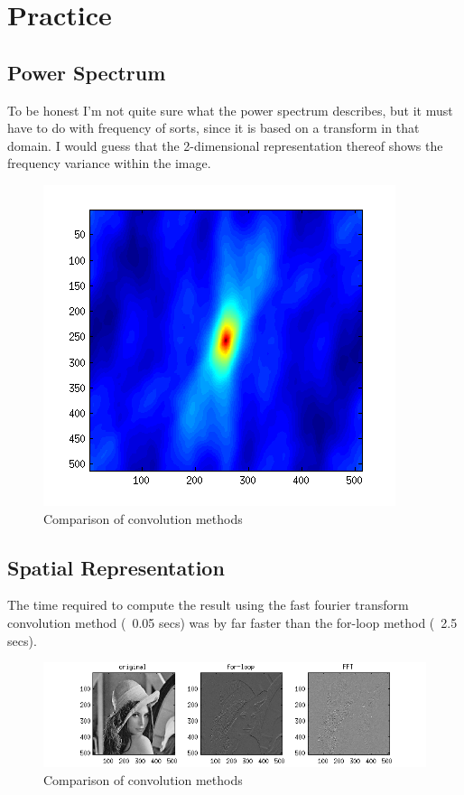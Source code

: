 %
%

\section{Practice}

\subsection{Power Spectrum}
To be honest I'm not quite sure what the power spectrum describes, but it must
have to do with frequency of sorts, since it is based on a transform in that
domain. I would guess that the 2-dimensional representation thereof shows the
frequency variance within the image.

\begin{figure}[H]
    \center
    \includegraphics[scale=0.75]{figures/2-a}
    \caption{Comparison of convolution methods}
    \label{fig:2-a}
\end{figure}

\subsection{Spatial Representation}
The time required to compute the result using the fast fourier transform
convolution method (~0.05 secs) was by far faster than the for-loop method
(~2.5 secs).

\begin{figure}[H]
    \center
    \includegraphics[scale=0.75]{figures/2-b}
    \caption{Comparison of convolution methods}
    \label{fig:2-b}
\end{figure}


